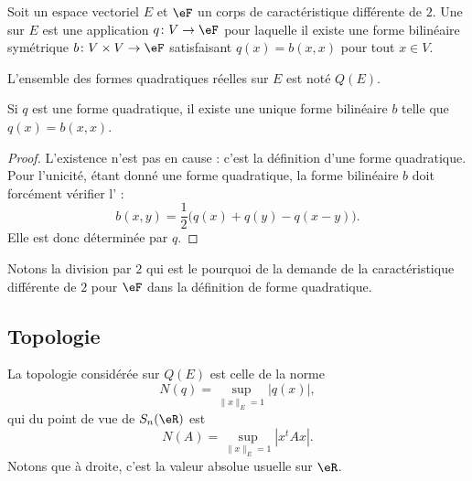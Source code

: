 \begin{definition}   \label{DefBSIoouvuKR}
    Soit un espace vectoriel \( E\) et \( \eF\) un corps de caractéristique différente de \( 2\). Une  sur \( E\) est une application \( q\colon V\to \eF\) pour laquelle il existe une forme bilinéaire symétrique \( b\colon V\times V\to \eF\) satisfaisant \( q(x)=b(x,x)\) pour tout \( x\in V\).

    L'ensemble des formes quadratiques réelles sur \( E\) est noté \( Q(E)\).
\end{definition}

\begin{lemma}       \label{LEMooLKNTooSfLSHt}
    Si \( q\) est une forme quadratique, il existe une unique forme bilinéaire \( b\) telle que \( q(x)=b(x,x)\).
\end{lemma}

\begin{proof}
    L'existence n'est pas en cause : c'est la définition d'une forme quadratique. Pour l'unicité, étant donné une forme quadratique, la forme bilinéaire \( b\) doit forcément vérifier l' :
\begin{equation}    \label{EqMrbsop}
    b(x,y)=\frac{ 1 }{2}\big( q(x)+q(y)-q(x-y) \big).
\end{equation}
Elle est donc déterminée par \( q\).
\end{proof}
Notons la division par \( 2\) qui est le pourquoi de la demande de la caractéristique différente de \( 2\) pour \( \eF\) dans la définition de forme quadratique.

\subsection{Topologie}

La topologie considérée sur \( Q(E)\) est celle de la norme
\begin{equation}    \label{EqZYBooZysmVh}
    N(q)=\sup_{\| x \|_E=1}| q(x) |,
\end{equation}
qui du point de vue de \( S_n(\eR)\) est
\begin{equation}    
    N(A)=\sup_{\| x \|_E=1}| x^tAx |.
\end{equation}
Notons que à droite, c'est la valeur absolue usuelle sur \( \eR\).

